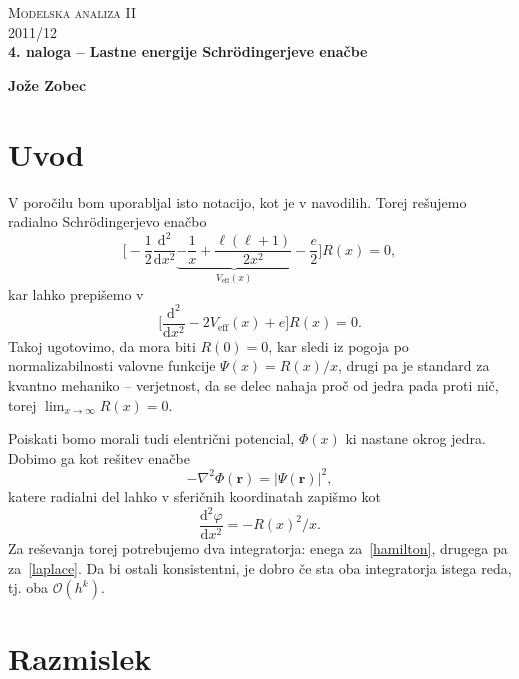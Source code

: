\documentclass[a4 paper, 12pt]{article}
\renewcommand{\d}{
	\ensuremath{\mathrm{d}}
}
\begin{document}
\begin{center}
\textsc{Modelska analiza II}\\
\textsc{2011/12}\\[0.5cm]
\textbf{4. naloga -- Lastne energije Schr\" odingerjeve ena\v cbe}
\end{center}
\begin{flushright}
\textbf{Jože Zobec}\\
\end{flushright}

\section{Uvod}

V poro\v cilu bom uporabljal isto notacijo, kot je v navodilih. Torej re\v sujemo radialno
Schr\" odingerjevo ena\v cbo
\begin{equation}
	\bigg[-\frac{1}{2}\frac{\d^2}{\d x^2} \underbrace{- \frac{1}{x} + \frac{\ell(\ell + 1)}
		{2x^2}}_{V_\text{eff}(x)} - \frac{e}{2}\bigg] R(x) = 0,
\end{equation}
kar lahko prepi\v semo v
\begin{equation}
	\bigg[\frac{\d^2}{\d x^2} - 2 V_\text{eff}(x) + e\bigg] R(x) = 0.
	\label{hamilton}
\end{equation}
Takoj ugotovimo, da mora biti $R(0) = 0$, kar sledi iz pogoja po normalizabilnosti valovne funkcije
$\Psi(x) = R(x)/x$, drugi pa je standard za kvantno mehaniko -- verjetnost, da se delec nahaja pro\v c
od jedra pada proti ni\v c, torej $\lim_{x \to \infty} R(x) = 0$.

Poiskati bomo morali tudi elentri\v cni potencial, $\Phi(x)$ ki nastane okrog jedra. Dobimo ga kot re\v sitev
ena\v cbe
\begin{equation}
	-\nabla^2 \Phi(\mathbf{r}) = |\Psi(\mathbf{r})|^2,
\end{equation}
katere radialni del lahko v sferi\v cnih koordinatah zapi\v smo kot
\begin{equation}
	\frac{\d^2 \varphi}{\d x^2} = -R(x)^2/x.
	\label{laplace}
\end{equation}
Za re\v sevanja torej potrebujemo dva integratorja: enega za~\eqref{hamilton}, drugega pa za~\eqref{laplace}.
Da bi ostali konsistentni, je dobro \v ce sta oba integratorja istega reda, tj. oba $\mathcal{O}(h^k)$.

\section{Razmislek}
\end{document}

